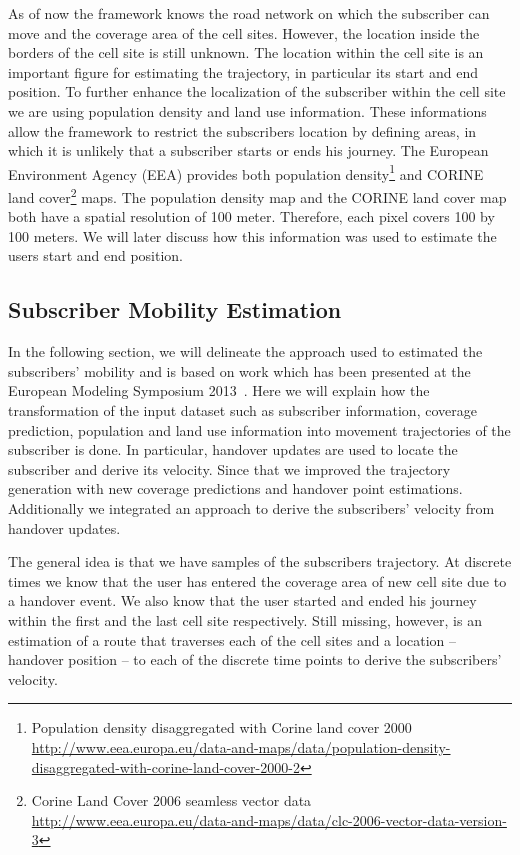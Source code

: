\documentclass[twocolumn]{bmcart}%
\begin{document}
As of now the framework knows the road network on which the subscriber can move and the coverage area of the cell sites. However, the location inside the borders of the cell site is still unknown. The location within the cell site is an important figure for estimating the trajectory, in particular its start and end position. To further enhance the localization of the subscriber within the cell site we are using population density and land use information. These informations allow the framework to restrict the subscribers location by defining areas, in which it is unlikely that a subscriber starts or ends his journey. The European Environment Agency (EEA) provides both population density\footnote{Population density disaggregated with Corine land cover 2000 \url{http://www.eea.europa.eu/data-and-maps/data/population-density-disaggregated-with-corine-land-cover-2000-2}} and CORINE land cover\footnote{Corine Land Cover 2006 seamless vector data \url{http://www.eea.europa.eu/data-and-maps/data/clc-2006-vector-data-version-3}} maps. The population density map and the CORINE land cover map both have a spatial resolution of 100 meter. Therefore, each pixel covers 100 by 100 meters. We will later discuss how this information was used to estimate the users start and end position.

\subsection*{Subscriber Mobility Estimation}
In the following section, we will delineate the approach used to estimated the subscribers' mobility and is based on work which has been presented at the European Modeling Symposium 2013~\cite{Kieslich2013}. Here we will explain how the transformation of the input dataset such as subscriber information, coverage prediction, population and land use information into movement trajectories of the subscriber is done. In particular, handover updates are used to locate the subscriber and derive its velocity. Since that we improved the trajectory generation with new coverage predictions and handover point estimations. Additionally we integrated an approach to derive the subscribers' velocity from handover updates.

The general idea is that we have samples of the subscribers trajectory. At discrete times we know that the user has entered the coverage area of new cell site due to a handover event. We also know that the user started and ended his journey within the first and the last cell site respectively. Still missing, however, is an estimation of a route that traverses each of the cell sites and a location -- handover position -- to each of the discrete time points to derive the subscribers' velocity.
\end{document}
